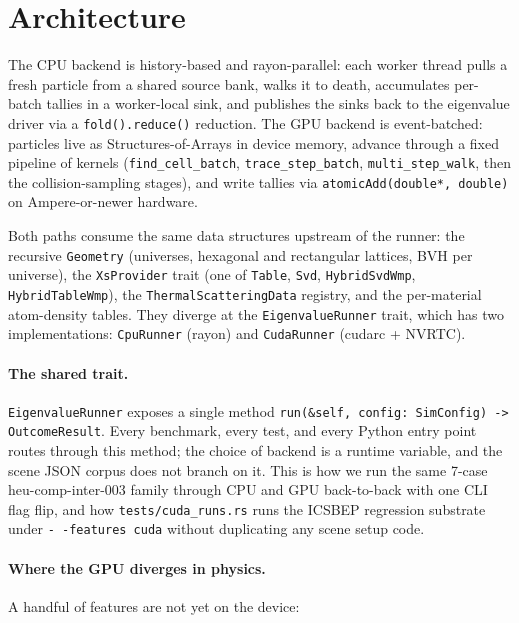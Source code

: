 \section{Architecture}
\label{sec:architecture}

The CPU backend is history-based and rayon-parallel: each worker
thread pulls a fresh particle from a shared source bank, walks it
to death, accumulates per-batch tallies in a worker-local sink, and
publishes the sinks back to the eigenvalue driver via a
\texttt{fold().reduce()} reduction. The GPU backend is event-batched:
particles live as Structures-of-Arrays in device memory, advance
through a fixed pipeline of kernels (\texttt{find\_cell\_batch},
\texttt{trace\_step\_batch}, \texttt{multi\_step\_walk}, then the
collision-sampling stages), and write tallies via
\texttt{atomicAdd(double*, double)} on Ampere-or-newer hardware.

Both paths consume the same data structures upstream of the
runner: the recursive \texttt{Geometry} (universes, hexagonal and
rectangular lattices, BVH per universe), the \texttt{XsProvider}
trait (one of \texttt{Table}, \texttt{Svd}, \texttt{HybridSvdWmp},
\texttt{HybridTableWmp}), the \texttt{ThermalScatteringData}
registry, and the per-material atom-density tables. They diverge
at the \texttt{EigenvalueRunner} trait, which has two
implementations: \texttt{CpuRunner} (rayon) and \texttt{CudaRunner}
(cudarc + NVRTC).

\paragraph{The shared trait.} \texttt{EigenvalueRunner} exposes a
single method \texttt{run(\&self, config: SimConfig) ->
OutcomeResult}. Every benchmark, every test, and every Python
entry point routes through this method; the choice of backend is a
runtime variable, and the scene JSON corpus does not branch on it.
This is how we run the same 7-case heu-comp-inter-003 family
through CPU and GPU back-to-back with one CLI flag flip, and how
\texttt{tests/cuda\_runs.rs} runs the ICSBEP regression substrate
under \texttt{-\,-features cuda} without duplicating any scene
setup code.

\paragraph{Where the GPU diverges in physics.} A handful of
features are not yet on the device:

